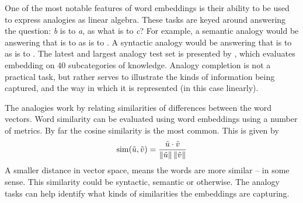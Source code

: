 \documentclass[parskip]{komatufte}
\begin{document}


One of the most notable features of  word embeddings is their ability to be used to express analogies as linear algebra.
These tasks are keyed around answering the question: \emph{b} is to \emph{a}, as what is  to \emph{c}?
For example, a semantic analogy would be answering that  is to  as  is to .
A syntactic analogy would be answering that  is to  as  is to .
The latest and largest analogy test set is presented by ,
which evaluates embedding on 40 subcategories of knowledge.
Analogy completion is not a practical task, but rather serves to illustrate the kinds of information being captured, and the way in which it is represented (in this case linearly).


The analogies work by relating similarities of differences between the word vectors.
Word similarity can be evaluated using word embeddings using a number of metrics.
By far the cosine similarity is the most common.
This is given by 
\begin{equation}
\mathrm{sim}(\tilde{u}, \tilde{v})=\frac{\tilde{u}\cdot \tilde{v}}{\left\Vert \tilde{u}\right\Vert \left\Vert \tilde{v}\right\Vert }
\end{equation}
A smaller distance in vector space, means the words are more similar -- in some sense.
This similarity could be syntactic, semantic or otherwise.
The analogy tasks can help identify what kinds of similarities the embeddings are capturing.
\end{document}
